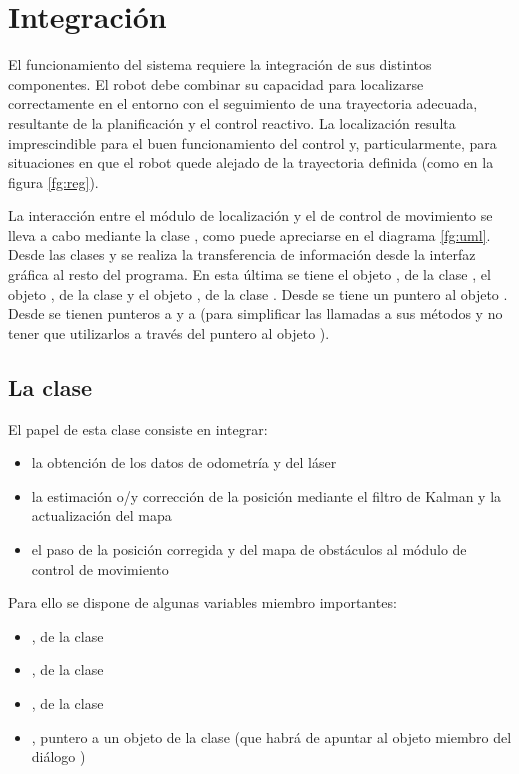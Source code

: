 
\chapter{Integración}\label{ch:integracion}

El funcionamiento del sistema requiere la integración de sus distintos componentes. El robot debe combinar su capacidad para localizarse correctamente en el entorno con el seguimiento de una trayectoria adecuada, resultante de la planificación y el control reactivo. La localización resulta imprescindible para el buen funcionamiento del control y, particularmente, para situaciones en que el robot quede alejado de la trayectoria definida (como en la figura \ref{fg:reg}).

La interacción entre el módulo de localización y el de control de movimiento se lleva a cabo mediante la clase , como puede apreciarse en el diagrama \ref{fg:uml}. Desde las clases  y  se realiza la transferencia de información desde la interfaz gráfica al resto del programa. En esta última se tiene el objeto , de la clase , el objeto , de la clase  y el objeto , de la clase . Desde  se tiene un puntero al objeto . Desde  se tienen punteros a   y a  (para simplificar las llamadas a sus métodos y no tener que utilizarlos a través del puntero al objeto ).

\section{La clase }
El papel de esta clase consiste en integrar:
\begin{itemize}
  \item la obtención de los datos de odometría y del láser
  \item la estimación o/y corrección de la posición mediante el filtro de Kalman y la actualización del mapa
  \item el paso de la posición corregida y del mapa de obstáculos al módulo de control de movimiento
\end{itemize}

Para ello se dispone de algunas variables miembro importantes:
\begin{itemize}
  \item {}, de la clase 
  \item {}, de la clase 
  \item {}, de la clase 
  \item {}, puntero a un objeto de la clase  (que habrá de apuntar al objeto  miembro del diálogo )
\end{itemize}


